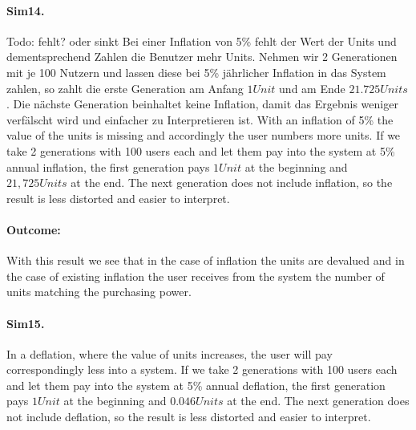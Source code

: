 \paragraph{Sim14.} Todo: fehlt? oder sinkt
Bei einer Inflation von 5\% fehlt der Wert der Units und dementsprechend Zahlen die Benutzer mehr Units. Nehmen wir 2 Generationen mit je 100 Nutzern und lassen diese bei 5\% jährlicher Inflation in das System zahlen, so zahlt die erste Generation am Anfang $1 Unit$  und am Ende $21.725 Units$. Die nächste Generation beinhaltet keine Inflation, damit das Ergebnis weniger verfälscht wird und einfacher zu Interpretieren ist. 
With an inflation of 5\% the value of the units is missing and accordingly the user numbers more units. If we take 2 generations with 100 users each and let them pay into the system at 5\% annual inflation, the first generation pays $1 Unit$ at the beginning and $21,725 Units$ at the end. The next generation does not include inflation, so the result is less distorted and easier to interpret. 

\paragraph{Outcome:}

\begin{table}[hbt!]
\centering
{}
\end{table}

With this result we see that in the case of inflation the units are devalued and in the case of existing inflation the user receives from the system the number of units matching the purchasing power.

\paragraph{Sim15.} In a deflation, where the value of units increases, the user will pay correspondingly less into a system. If we take 2 generations with 100 users each and let them pay into the system at 5\% annual deflation, the first generation pays $1 Unit$ at the beginning and $0.046 Units$ at the end. The next generation does not include deflation, so the result is less distorted and easier to interpret. 

